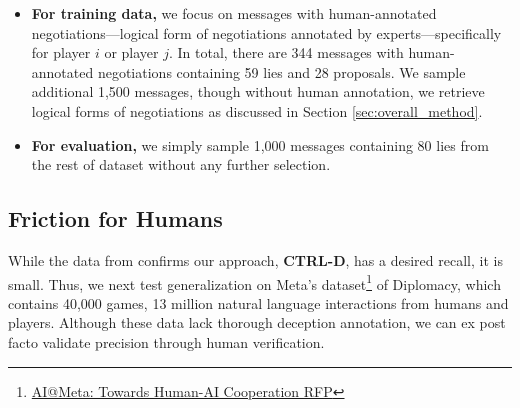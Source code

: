 \begin{itemize}
    \item \textbf{For training data,} we focus on messages 
    with human-annotated negotiations---logical form of negotiations annotated by experts---specifically for player \(i\) or player \(j\). 
    In total, there are 344 messages with human-annotated negotiations containing 59 lies and 28 proposals. We sample additional 1,500 messages, though without human annotation, we retrieve logical forms of negotiations as discussed in Section \ref{sec:overall_method}. 
    \item \textbf{For evaluation,} we simply sample 1,000 messages containing 80 lies from the rest of dataset without any further selection.
\end{itemize}


\subsection{Friction for Humans} 
\label{sec:friction}
While the data from \citet{peskov2020takes} confirms our approach, \textbf{CTRL-D}, has a desired recall, it is small. Thus, we next test generalization on Meta's dataset\footnote{\href{https://ai.meta.com/research/request-for-proposal/towards-human-AI-cooperation/}{AI@Meta: Towards Human-AI Cooperation RFP}} of Diplomacy, which contains 40,000 games, 13 million natural language interactions from humans and \cicero players. Although these data lack thorough deception annotation, we can ex post facto validate precision through human verification. 

